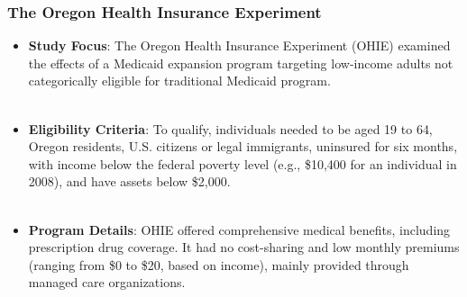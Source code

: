 \documentclass[notes,10pt, aspectratio=169]{beamer}
\begin{document}
\begin{frame}
\frametitle{The Oregon Health Insurance Experiment}

\begin{itemize}
  \item \textbf{Study Focus}: The Oregon Health Insurance Experiment (OHIE) examined the effects of a Medicaid expansion program targeting low-income adults not categorically eligible for traditional Medicaid program.\\\\[1em]

  \item \textbf{Eligibility Criteria}: To qualify, individuals needed to be aged 19 to 64, Oregon residents, U.S. citizens or legal immigrants, uninsured for six months, with income below the federal poverty level (e.g., \$10,400 for an individual in 2008), and have assets below \$2,000.\\\\[1em]

  \item \textbf{Program Details}: OHIE offered comprehensive medical benefits, including prescription drug coverage. It had no cost-sharing and low monthly premiums (ranging from \$0 to \$20, based on income), mainly provided through managed care organizations.\\\\[1em]
\end{itemize}
\end{frame}
\end{document}
